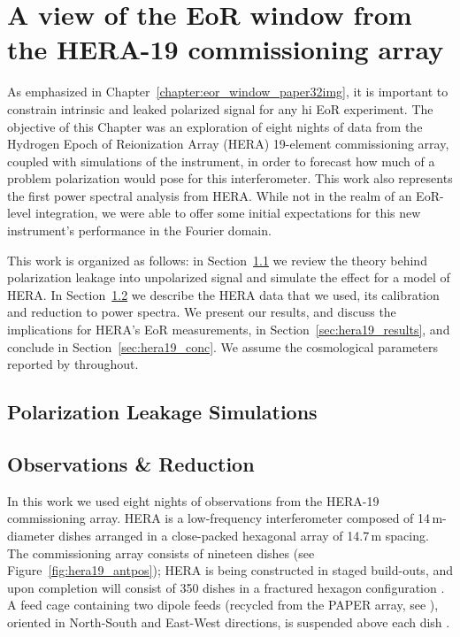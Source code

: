 \chapter{A view of the EoR window from the HERA-19 commissioning array}
\label{chapter:eor_window_HERA}

As emphasized in Chapter~\ref{chapter:eor_window_paper32img}, it is important to constrain intrinsic and leaked polarized signal for any {\sc hi} EoR experiment. 
The objective of this Chapter was an exploration of eight nights of data from the Hydrogen Epoch of Reionization Array (HERA) 19-element commissioning array, coupled with simulations of the instrument, in order to forecast how much of a problem polarization would pose for this interferometer. 
This work also represents the first power spectral analysis from HERA. While not in the realm of an EoR-level integration, we were able to offer some initial expectations for this new instrument's performance in the Fourier domain.

This work is organized as follows: in Section~\ref{sec:hera19_leak} we review the theory behind polarization leakage into unpolarized signal and simulate the effect for a model of HERA. In Section~\ref{sec:hera19_obs} we describe the HERA data that we used, its calibration and reduction to power spectra. We present our results, and discuss the implications for HERA's EoR measurements, in Section~\ref{sec:hera19_results}, and conclude in Section~\ref{sec:hera19_conc}. We assume the cosmological parameters reported by \cite{Planck.16} throughout.

\section{Polarization Leakage Simulations}
\label{sec:hera19_leak}


\section{Observations \& Reduction}
\label{sec:hera19_obs}

In this work we used eight nights of observations from the HERA-19 commissioning array. HERA is a low-frequency interferometer composed of 14\,m-diameter dishes arranged in a close-packed hexagonal array of 14.7\,m spacing. The commissioning array consists of nineteen dishes (see Figure~\ref{fig:hera19_antpos}); HERA is being constructed in staged build-outs, and upon completion will consist of 350 dishes in a fractured hexagon configuration \citep[see][]{Dillon.16, deBoer.17}. A feed cage containing two dipole feeds (recycled from the PAPER array, see \citealt{Parsons.10}), oriented in North-South and East-West directions, is suspended above each dish \citep{Neben.16,Ewall-Wice.16.HERA_Dish,Thyagarajan.16}.

